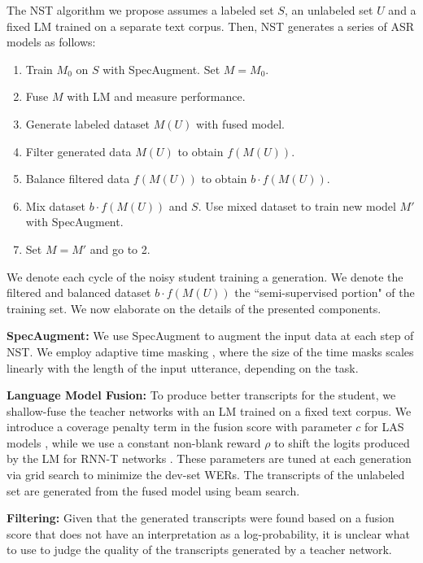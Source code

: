 \documentclass[a4paper]{article}
\begin{document}
The NST algorithm we propose assumes a labeled set $S$, an unlabeled set $U$ and a fixed LM trained on a separate text corpus. Then, NST generates a series of ASR models as follows:
\begin{enumerate}
\item Train $M_0$ on $S$ with SpecAugment. Set $M = M_0$.
\item Fuse $M$ with LM and measure performance.
\item Generate labeled dataset $M(U)$ with fused model.
\item Filter generated data $M(U)$ to obtain $f(M(U))$.
\item Balance filtered data $f(M(U))$ to obtain $b \cdot f(M(U))$.
\item Mix dataset $b \cdot f (M(U))$ and $S$. Use mixed dataset to train new model $M'$ with SpecAugment.
\item Set $M = M'$ and go to 2.
\end{enumerate}
We denote each cycle of the noisy student training a generation. We denote the filtered and balanced dataset $b \cdot f (M(U))$ the ``semi-supervised portion" of the training set. We now elaborate on the details of the presented components.
\smallskip

\noindent\textbf{SpecAugment:}
We use SpecAugment \cite{specaugment} to augment the input data at each step of NST. We employ adaptive time masking \cite{largespecaugment}, where the size of the time masks scales linearly with the length of the input utterance, depending on the task.
\smallskip

\noindent\textbf{Language Model Fusion: }
To produce better transcripts for the student, we shallow-fuse \cite{shallowfusion} the teacher networks with an LM trained on a fixed text corpus. We introduce a coverage penalty term \cite{coveragepenalty} in the fusion score with parameter $c$ for LAS models \cite{LAS}, while we use a constant non-blank reward $\rho$ to shift the logits produced by the LM for RNN-T \cite{RNNT} networks \cite{sak2015fast,zhang2020transformer}. These parameters are tuned at each generation via grid search to minimize the dev-set WERs. The transcripts of the unlabeled set are generated from the fused model using beam search.
\smallskip

\noindent\textbf{Filtering: }
Given that the generated transcripts were found based on a fusion score that does not have an interpretation as a log-probability, it is unclear what to use to judge the quality of the transcripts generated by a teacher network.
\end{document}
